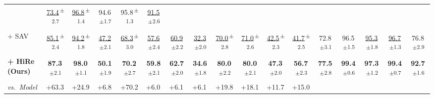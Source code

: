 \documentclass[sigconf,review,anonymous,9pt,table]{acmart}
\begin{document}
\begin{table}[t]
{\begin{tabular}{@{}l
  c c
  c c c c c
  c c c c
  c c c c c
  @{}}
  & \underline{73.4}\textsuperscript{\,$\pm$2.7} & \underline{96.8}\textsuperscript{\,$\pm$1.4} & 94.6\textsuperscript{\,$\pm$1.7} & 95.8\textsuperscript{\,$\pm$1.3} & \underline{91.5}\textsuperscript{\,$\pm$2.6} \\
+ SAV~\cite{mitra2025enhancing}
  & \underline{85.1}\textsuperscript{\,$\pm$2.4} & \underline{94.2}\textsuperscript{\,$\pm$1.8} & \underline{47.2}\textsuperscript{\,$\pm$2.1} & \underline{68.3}\textsuperscript{\,$\pm$3.0} & \underline{57.6}\textsuperscript{\,$\pm$2.4} & \underline{60.9}\textsuperscript{\,$\pm$2.2} & \underline{32.3}\textsuperscript{\,$\pm$2.0}
  & \underline{70.0}\textsuperscript{\,$\pm$2.8} & \underline{71.0}\textsuperscript{\,$\pm$2.6} & \underline{42.5}\textsuperscript{\,$\pm$2.3} & \underline{41.7}\textsuperscript{\,$\pm$2.5}
  & 72.8\textsuperscript{\,$\pm$3.1} & 96.5\textsuperscript{\,$\pm$1.5} & \underline{95.3}\textsuperscript{\,$\pm$1.8} & \underline{96.7}\textsuperscript{\,$\pm$1.3} & 76.8\textsuperscript{\,$\pm$2.9} \\
\cellcolor{myblue!8}\textbf{+ HiRe (Ours)}
  & \cellcolor{myblue!8}\textbf{87.3}\textsuperscript{\,$\pm$2.1} & \cellcolor{myblue!8}\textbf{98.0}\textsuperscript{\,$\pm$1.1} & \cellcolor{myblue!8}\textbf{50.1}\textsuperscript{\,$\pm$1.9} & \cellcolor{myblue!8}\textbf{70.2}\textsuperscript{\,$\pm$2.7} & \cellcolor{myblue!8}\textbf{59.8}\textsuperscript{\,$\pm$2.1} & \cellcolor{myblue!8}\textbf{62.7}\textsuperscript{\,$\pm$2.0} & \cellcolor{myblue!8}\textbf{34.6}\textsuperscript{\,$\pm$1.8}
  & \cellcolor{myblue!8}\textbf{80.0}\textsuperscript{\,$\pm$2.2} & \cellcolor{myblue!8}\textbf{80.0}\textsuperscript{\,$\pm$2.1} & \cellcolor{myblue!8}\textbf{47.3}\textsuperscript{\,$\pm$2.0} & \cellcolor{myblue!8}\textbf{56.7}\textsuperscript{\,$\pm$2.3}
  & \cellcolor{myblue!8}\textbf{77.5}\textsuperscript{\,$\pm$2.8} & \cellcolor{myblue!8}\textbf{99.4}\textsuperscript{\,$\pm$0.6} & \cellcolor{myblue!8}\textbf{97.3}\textsuperscript{\,$\pm$1.2} & \cellcolor{myblue!8}\textbf{99.4}\textsuperscript{\,$\pm$0.7} & \cellcolor{myblue!8}\textbf{92.7}\textsuperscript{\,$\pm$1.6} \\
\textcolor{mygreen}{\textit{vs.~Model}}
  & \multicolumn{1}{l}{\textcolor{mygreen}{+63.3}} & \multicolumn{1}{l}{\textcolor{mygreen}{+24.9}} & \multicolumn{1}{l}{\textcolor{mygreen}{+6.8}} & \multicolumn{1}{l}{\textcolor{mygreen}{+70.2}} & \multicolumn{1}{l}{\textcolor{mygreen}{+6.0}} & \multicolumn{1}{l}{\textcolor{mygreen}{+6.1}} & \multicolumn{1}{l}{\textcolor{mygreen}{+6.1}}
  & \multicolumn{1}{l}{\textcolor{mygreen}{+19.8}} & \multicolumn{1}{l}{\textcolor{mygreen}{+18.1}} & \multicolumn{1}{l}{\textcolor{mygreen}{+11.7}} & \multicolumn{1}{l}{\textcolor{mygreen}{+15.0}}

\end{tabular}}
\end{table}
\end{document}
